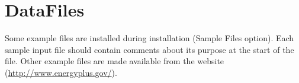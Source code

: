\section{DataFiles}\label{datafiles}

Some example files are installed during installation (Sample Files option). Each sample input file should contain comments about its purpose at the start of the file. Other example files are made available from the website (\url{http://www.energyplus.gov/}).
